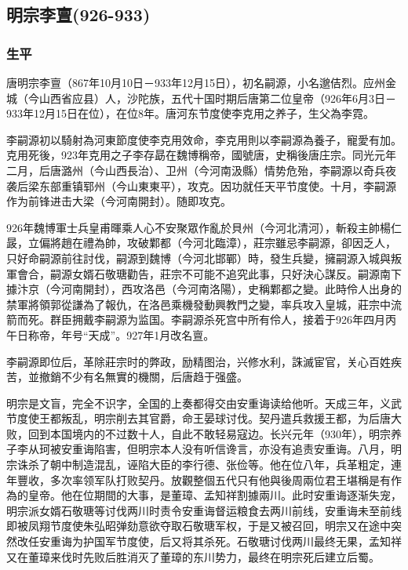 
\subsection{明宗李亶\tiny(926-933)}

\subsubsection{生平}

唐明宗李亶（867年10月10日－933年12月15日），初名嗣源，小名邈佶烈。应州金城（今山西省应县）人，沙陀族，五代十国时期后唐第二位皇帝（926年6月3日－933年12月15日在位），在位8年。唐河东节度使李克用之养子，生父為李霓。

李嗣源初以騎射為河東節度使李克用效命，李克用則以李嗣源為養子，寵愛有加。克用死後，923年克用之子李存勗在魏博稱帝，國號唐，史稱後唐庄宗。同光元年二月，后唐潞州（今山西長治）、卫州（今河南汲縣）情势危殆，李嗣源以奇兵夜袭后梁东部重镇郓州（今山東東平），攻克。因功就任天平节度使。十月，李嗣源作为前锋进击大梁（今河南開封）。随即攻克。

926年魏博軍士兵皇甫暉乘人心不安聚眾作亂於貝州（今河北清河），斬殺主帥楊仁晸，立偏將趙在禮為帥，攻破鄴都（今河北臨漳），莊宗雖忌李嗣源，卻因乏人，只好命嗣源前往討伐，嗣源到魏博（今河北邯鄲）時，發生兵變，擁嗣源入城與叛軍會合，嗣源女婿石敬瑭勸告，莊宗不可能不追究此事，只好決心謀反。嗣源南下據汴京（今河南開封），西攻洛邑（今河南洛陽），史稱鄴都之變。此時伶人出身的禁軍將領郭從謙為了報仇，在洛邑乘機發動興教門之變，率兵攻入皇城，莊宗中流箭而死。群臣拥戴李嗣源为监国。李嗣源杀死宫中所有伶人，接着于926年四月丙午日称帝，年号“天成”。927年1月改名亶。

李嗣源即位后，革除莊宗时的弊政，励精图治，兴修水利，誅滅宦官，关心百姓疾苦，並撤銷不少有名無實的機關，后唐趋于强盛。

明宗是文盲，完全不识字，全国的上奏都得交由安重诲读给他听。天成三年，义武节度使王都叛乱，明宗削去其官爵，命王晏球讨伐。契丹遣兵救援王都，为后唐大败，回到本国境内的不过数十人，自此不敢轻易寇边。长兴元年（930年），明宗养子李从珂被安重诲陷害，但明宗本人没有听信谗言，亦没有追责安重诲。八月，明宗诛杀了朝中制造混乱，诬陷大臣的李行德、张俭等。他在位八年，兵革粗定，連年豐收，多次率领军队打败契丹。放觀整個五代只有他與後周兩位君王堪稱是有作為的皇帝。他在位期間的大事，是董璋、孟知祥割據兩川。此时安重诲逐渐失宠，明宗派女婿石敬瑭等讨伐两川时责令安重诲督运粮食去两川前线，安重诲未至前线即被凤翔节度使朱弘昭弹劾意欲夺取石敬瑭军权，于是又被召回，明宗又在途中突然改任安重诲为护国军节度使，后又将其杀死。石敬瑭讨伐两川最终无果，孟知祥又在董璋来伐时先败后胜消灭了董璋的东川势力，最终在明宗死后建立后蜀。

